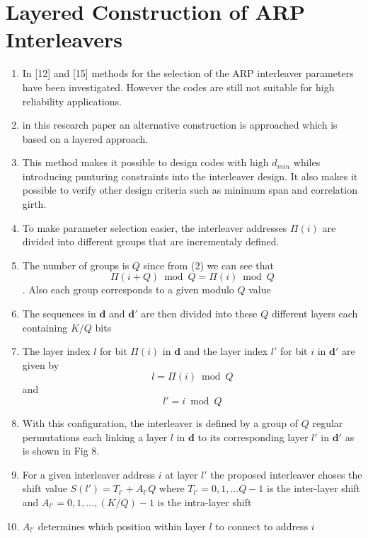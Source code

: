 \documentclass[fontsize=12pt]{article}
\begin{document}
\section{Layered Construction of ARP Interleavers}
\begin{enumerate}
\item In [12] and [15] methods for the selection of the ARP interleaver parameters have been investigated. However the codes are still not suitable for high reliability applications.

\item in this research paper an alternative construction is approached which is based on a layered approach.

\item This method makes it possible to design codes with high $d_{min}$ whiles introducing punturing constraints into the interleaver design. It also makes it possible to verify other design criteria such as minimum span and correlation girth.

\item To make parameter selection easier, the interleaver addresses $\Pi(i)$ are divided into different groups that are incrementaly defined.

\item The number of groups is $Q$ since from (2) we can see that $$\Pi(i+Q) \bmod Q =\Pi(i) \bmod Q$$. Also each group corresponds to a given modulo $Q$ value

\item The sequences in $\mathbf{d}$ and $\mathbf{d}'$ are then divided into these $Q$ different layers each containing $K/Q$ bits

\item The layer index $l$ for bit $\Pi(i)$ in $\mathbf{d}$ and the layer index $l'$ for bit $i$ in  $\mathbf{d}'$ are given by
$$l =\Pi(i) \bmod Q$$ and $$l' = i \bmod Q$$

\item With this configuration, the interleaver is defined by a group of $Q$ regular permutations each linking a layer $l$ in $\mathbf{d}$ to its corresponding layer $l'$ in $\mathbf{d}'$ as is shown in Fig 8.

\item For a given interleaver address $i$ at layer $l'$ the proposed interleaver choses the shift value $S(l') = T_{l'}+A_{l'}Q$ where $T_{l'}=0,1,...Q-1$ is the inter-layer shift and $A_{l'}=0,1,...,(K/Q)-1$ is the intra-layer shift

\item $A_{l'}$ determines which position within layer $l$ to connect to address $i$


\end{enumerate}
\end{document}

